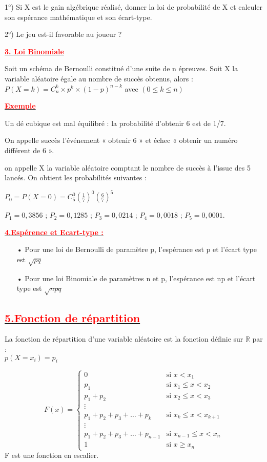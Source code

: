\documentclass[12pt]{article}
\begin{document}
1°) Si X est le gain algébrique réalisé, donner la loi de probabilité de X et calculer son espérance mathématique et son écart-type.

2°) Le jeu est-il favorable au joueur ?

\underline{\textbf{\textcolor{red}{3. Loi Binomiale}}}

Soit un schéma de Bernoulli constitué d’une suite de n épreuves.
Soit X la variable aléatoire égale au nombre de succès obtenus, alors :\\
$P(X=k)=C_{n}^{k}\times p^{k}\times (1-p)^{n-k}$ avec $(0\leq k\leq n)$

\underline{\textbf{\textcolor{red}{Exemple}}}

Un dé cubique est mal équilibré : la probabilité d’obtenir 6 est de 1/7.

On appelle succès l’événement « obtenir 6 » et échec « obtenir un numéro différent de 6 ».

on appelle X la variable aléatoire comptant le nombre de succès à l’issue des 5 lancés. On obtient les probabilités suivantes :

$P_{0}=P(X=0)=C_{5}^{0}(\frac{1}{7})^{0}(\frac{6}{7})^{5}$

$P_{1} =0,3856$ ; $P_{2} = 0,1285$ ; $P_{3} = 0,0214$ ; $P_{4} = 0,0018$ ; $P_{5} = 0,0001$.

\underline{\textbf{\textcolor{red}{4.Espérence et Ecart-type :}}}

\begin{itemize}
\item[•] Pour une loi de Bernoulli de paramètre p, l’espérance est p et l’écart type est $\sqrt{pq}$
\item[•] Pour une loi Binomiale de paramètres n et p, l’espérance est np et l’écart type est 
$\sqrt{npq} $
\end{itemize}
\subsection*{\underline{\textbf{\textcolor{red}{5.Fonction de répartition}}}}
La fonction de répartition d'une variable aléatoire est la fonction définie sur $\mathbb{R}$ par :\\
$p(X=x_{i})=p_{i}$

\begin{equation*}
F(x)=\begin{cases}
0 & \text{si } x < x_{1}\\
p_{1} & \text{si } x_{1} \leq x < x_{2}\\
p_{1} + p_{2} & \text{si } x_{2} \leq x < x_{3}\\
\vdots \\
p_{1} + p_{2} + p_{3} + \ldots + p_{k} & \text{si } x_{k} \leq x < x_{k+1}\\
\vdots \\
p_{1} + p_{2} + p_{3} + \ldots + p_{n-1} & \text{si } x_{n-1} \leq x < x_{n}\\
1 & \text{si } x \geq x_{n}
\end{cases}
\end{equation*}
F  est une fonction en escalier.
\end{document}
